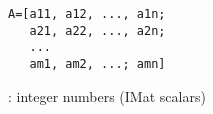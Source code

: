 
\begin{mandesc}
\end{mandesc}
\begin{calling_sequence}
\begin{verbatim}
A=[a11, a12, ..., a1n;
   a21, a22, ..., a2n;
   ...
   am1, am2, ...; amn]
\end{verbatim}
\end{calling_sequence}
\begin{parameters}
  \begin{varlist}
    : integer numbers (IMat scalars)
  \end{varlist}
\end{parameters}

